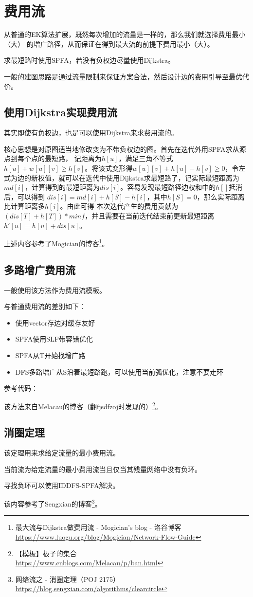 \section{费用流}
从普通的EK算法扩展，既然每次增加的流量是一样的，那么我们就选择费用最小（大）
的增广路径，从而保证在得到最大流的前提下费用最小（大）。

求最短路时使用SPFA，若没有负权边尽量使用Dijkstra。

一般的建图思路是通过流量限制来保证方案合法，然后设计边的费用引导至最优代价。

\subsection{使用Dijkstra实现费用流}\label{DijMCMF}
其实即使有负权边，也是可以使用Dijkstra来求费用流的。

核心思想是对原图适当地修改变为不带负权边的图。首先在迭代外用SPFA求从源点到每个点的最短路，
记距离为$h[u]$，满足三角不等式$h[u]+w[u][v]\geq h[v]$。将该式变形得$w[u][v]+h[u]-h[v]
\geq 0$，令左式为边的新权值，就可以在迭代中使用Dijkstra求最短路了，记实际最短距离为
$md[i]$，计算得到的最短距离为$dis[i]$。容易发现最短路径边权和中的$h[]$抵消后，可以得到
$dis[i]=md[i]+h[S]-h[i]$，其中$h[S]=0$，那么实际距离比计算距离多$h[i]$。由此可得
本次迭代产生的费用贡献为$(dis[T]+h[T])*minf$，并且需要在当前迭代结束前更新最短距离
$h'[u]=h[u]+dis[u]$。

上述内容参考了Mogician的博客\footnote{
    最大流与Dijkstra做费用流 - Mogician's blog - 洛谷博客
    \url{https://www.luogu.org/blog/Mogician/Network-Flow-Guide}}。
\subsection{多路增广费用流}
一般使用该方法作为费用流模板。

与普通费用流的差别如下：
\begin{itemize}
    \item 使用vector存边对缓存友好
    \item SPFA使用SLF带容错优化
    \item SPFA从T开始找增广路
    \item DFS多路增广从S沿着最短路跑，可以使用当前弧优化，注意不要走环
\end{itemize}

参考代码：


该方法来自Melacau的博客（翻fjsdfzoj时发现的）\footnote{
    【模板】板子的集合\\
    \url{https://www.cnblogs.com/Melacau/p/ban.html}
}。
\subsection{消圈定理}
该定理用来求给定流量的最小费用流。

\begin{theorem}[消圈定理]
	当前流为给定流量的最小费用流当且仅当其残量网络中没有负环。
\end{theorem}

寻找负环可以使用IDDFS-SPFA解决。

该内容参考了Sengxian的博客\footnote{
	网络流之 - 消圈定理（POJ 2175）\\
	\url{https://blog.sengxian.com/algorithms/clearcircle}
}。
